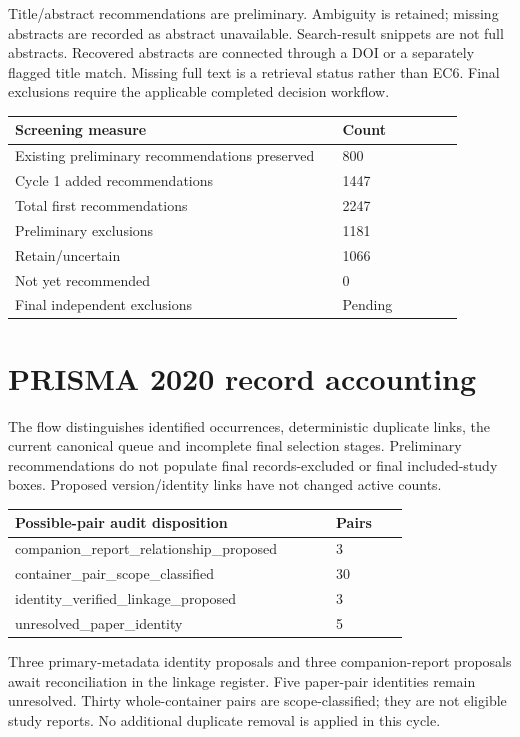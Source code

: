 \documentclass[12pt,a4paper]{article}
\begin{document}
Title/\allowbreak{}abstract recommendations are preliminary. Ambiguity is retained; missing abstracts are recorded as abstract unavailable. Search-result snippets are not full abstracts. Recovered abstracts are connected through a DOI or a separately flagged title match. Missing full text is a retrieval status rather than EC6. Final exclusions require the applicable completed decision workflow.


\begin{longtable}{p{0.65\linewidth}p{0.24\linewidth}}
\toprule
Screening measure & Count\\\midrule
\endhead
Existing preliminary recommendations preserved & 800\\
Cycle 1 added recommendations & 1447\\
Total first recommendations & 2247\\
Preliminary exclusions & 1181\\
Retain/\allowbreak{}uncertain & 1066\\
Not yet recommended & 0\\
Final independent exclusions & Pending\\
\bottomrule
\end{longtable}

\section{PRISMA 2020 record accounting}
The flow distinguishes identified occurrences, deterministic duplicate links, the current canonical queue and incomplete final selection stages. Preliminary recommendations do not populate final records-excluded or final included-study boxes. Proposed version/\allowbreak{}identity links have not changed active counts.



\begin{longtable}{p{0.7\linewidth}p{0.16\linewidth}}
\toprule
Possible-pair audit disposition & Pairs\\\midrule
\endhead
companion\_report\_relationship\_proposed & 3\\
container\_pair\_scope\_classified & 30\\
identity\_verified\_linkage\_proposed & 3\\
unresolved\_paper\_identity & 5\\
\bottomrule
\end{longtable}

Three primary-metadata identity proposals and three companion-report proposals await reconciliation in the linkage register. Five paper-pair identities remain unresolved. Thirty whole-container pairs are scope-classified; they are not eligible study reports. No additional duplicate removal is applied in this cycle.
\end{document}
